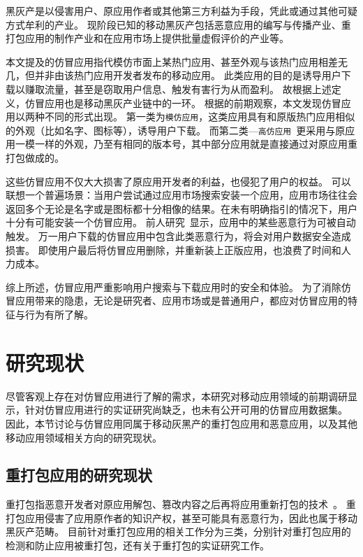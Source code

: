 黑灰产是以侵害用户、原应用作者或其他第三方利益为手段，凭此或通过其他可疑方式牟利的产业。
现阶段已知的移动黑灰产包括恶意应用的编写与传播产业、重打包应用的制作产业和在应用市场上提供批量虚假评价的产业等。

本文提及的仿冒应用指代模仿市面上某热门应用、甚至外观与该热门应用相差无几，但并非由该热门应用开发者发布的移动应用。
此类应用的目的是诱导用户下载以赚取流量，甚至是窃取用户信息、触发有害行为从而盈利。
故根据上述定义，仿冒应用也是移动黑灰产业链中的一环。
根据的前期观察，本文发现仿冒应用以两种不同的形式出现。
第一类为\texttt{模仿应用}，这类应用具有和原版热门应用相似的外观（比如名字、图标等），诱导用户下载。
而第二类---\texttt{高仿应用}~\cite{Andow2016ASO, luo2016repackage}更采用与原应用一模一样的外观，乃至有相同的版本号，其中部分应用就是直接通过对原应用重打包做成的。

这些仿冒应用不仅大大损害了原应用开发者的利益，也侵犯了用户的权益。
可以联想一个普遍场景：当用户尝试通过应用市场搜索安装一个应用，应用市场往往会返回多个无论是名字或是图标都十分相像的结果。在未有明确指引的情况下，用户十分有可能安装一个仿冒应用。
前人研究~\cite{Zhou2012DissectingAM}显示，应用中的某些恶意行为可被自动触发。
万一用户下载的仿冒应用中包含此类恶意行为，将会对用户数据安全造成损害。
即使用户最后将仿冒应用删除，并重新装上正版应用，也浪费了时间和人力成本。

综上所述，仿冒应用严重影响用户搜索与下载应用时的安全和体验。
为了消除仿冒应用带来的隐患，无论是研究者、应用市场或是普通用户，都应对仿冒应用的特征与行为有所了解。

\section{研究现状}
尽管客观上存在对仿冒应用进行了解的需求，本研究对移动应用领域的前期调研显示，针对仿冒应用进行的实证研究尚缺乏，也未有公开可用的仿冒应用数据集。
因此，本节讨论与仿冒应用同属于移动灰黑产的重打包应用和恶意应用，以及其他移动应用领域相关方向的研究现状。

\subsection{重打包应用的研究现状}
\label{sec:repackaging}
重打包指恶意开发者对原应用解包、篡改内容之后再将应用重新打包的技术~\cite{khanmohammadi2019empirical}。
重打包应用侵害了应用原作者的知识产权，甚至可能具有恶意行为，因此也属于移动黑灰产范畴。
目前针对重打包应用的相关工作分为三类，分别针对重打包应用的检测和防止应用被重打包，还有关于重打包的实证研究工作。

